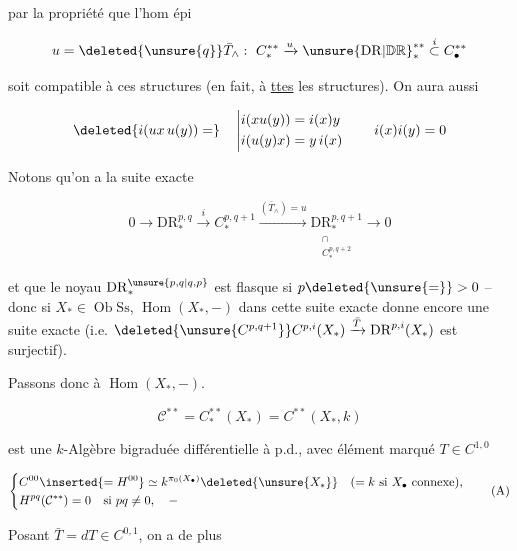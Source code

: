 
par la propriété que l'hom épi

\[
u=\deleted{\unsure{q}}\bar T_\wedge:\ C^{**}_*\xrightarrow{u}\unsure{\mathrm{DR}|\mathbb D\mathbb R}^{**}_*\mathrel{\overset{i}{\subset}}C^{**}_\bullet
\]

soit compatible à ces structures (en fait, à \uline{ttes} les structures). On aura aussi

\[
\deleted{i(ux\,u(y))=}\quad
\left|\begin{aligned}
i(xu(y))&=i(x)y\\
i(u(y)x)&=y\,i(x)
\end{aligned}\right.\qquad i(x)i(y)=0
\]

Notons qu'on a la suite exacte

\[
0\longrightarrow\mathrm{DR}^{p,q}_*\xrightarrow{i}C^{p,q+1}_*
\xrightarrow{(\bar T_\wedge)=u}\underset{\substack{\cap\\C^{p,q+2}_*}}{\mathrm{DR}^{p,q+1}_*}\longrightarrow0
\]

et que le noyau $\mathrm{DR}^{\unsure{p,q|q,p}}_*$ est flasque si $p\deleted{\unsure{=}}>0$ -- donc si $X_*\in\operatorname{Ob}\mathrm{Ss}$, $\operatorname{Hom}(X_*,-)$ dans cette suite exacte donne encore une suite exacte (i.e. $\deleted{\unsure{C^{p,q+1}}}C^{p,i}(X_*)\xrightarrow{\bar T}\mathrm{DR}^{p,i}(X_*)$ est surjectif).

Passons donc à $\operatorname{Hom}(X_*,-)$.

\[
\mathcal C^{**}=C^{**}_*(X_*)=C^{**}(X_*,k)
\]

est une $k$-Algèbre bigraduée différentielle à p.d., avec élément marqué $T\in C^{1,0}$

\[
\left\{\begin{aligned}
&C^{00}\inserted{=H^{00}}\simeq k^{\pi_0(X_\bullet)}\deleted{\unsure{X_*}}\quad(=k\text{ si }X_\bullet\text{ connexe}),\\
&H^{pq}(\mathcal C^{**})=0\quad\text{si }pq\ne0,\quad\relbar
\end{aligned}\right.\tag*{(A)}
\]

Posant $\bar T=dT\in C^{0,1}$, on a de plus

